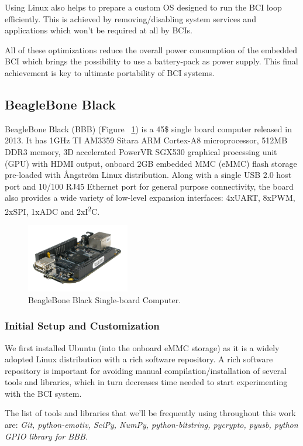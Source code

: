 \documentclass[12pt]{article}
\newcommand\mysubsection[1]{\subsection{#1}}
\newcommand\mysubsubsection[1]{\subsubsection{#1}}
\numberwithin{equation}{section}
\numberwithin{figure}{section}
\numberwithin{table}{section}
\begin{document}
\par{
Using Linux also helps to prepare a custom OS designed to run the BCI loop efficiently. 
This is achieved by removing/disabling system services and applications which won't be required at all by BCIs.
}

\par{
All of these optimizations reduce the overall power consumption of the embedded BCI which brings 
the possibility to use a battery-pack as power supply. This final achievement is key to ultimate 
portability of BCI systems.
}

\mysubsection{BeagleBone Black}\label{seq:embeddedcomputer_bbb}

\par{
BeagleBone Black (BBB) (Figure ~\ref{fig:bbb}) is a 45\$ single board computer released in 2013. It has 1GHz TI AM3359 Sitara ARM Cortex-A8 microprocessor, 
512MB DDR3 memory, 3D accelerated PowerVR SGX530 graphical processing unit (GPU) with HDMI output, onboard 2GB embedded MMC (eMMC) 
flash storage pre-loaded with Ångström Linux distribution. Along with a single USB 2.0 host port and 10/100 RJ45 Ethernet port for general purpose connectivity, the board also provides a wide variety of low-level expansion interfaces: 
4xUART, 8xPWM, 2xSPI, 1xADC and 2xI\textsuperscript{2}C.
}

\begin{figure}[ht]
    \centering
    \includegraphics[width=0.4\textwidth]{images/bbb}
    \caption{BeagleBone Black Single-board Computer.}
    \label{fig:bbb}
\end{figure}

\mysubsubsection{Initial Setup and Customization}\label{seq:embeddedcomputer_initialsetup}
\par{
We first installed Ubuntu (into the onboard eMMC storage) as it is a widely adopted Linux distribution with a rich software repository. A rich software repository is important for avoiding 
manual compilation/installation of several tools and libraries, which in turn decreases time needed to start experimenting with the BCI system.
}

\par{
The list of tools and libraries that we'll be frequently using throughout this work are: {\em Git, python-emotiv, SciPy, NumPy, python-bitstring, pycrypto, pyusb, python GPIO library for BBB.}
}
\end{document}
